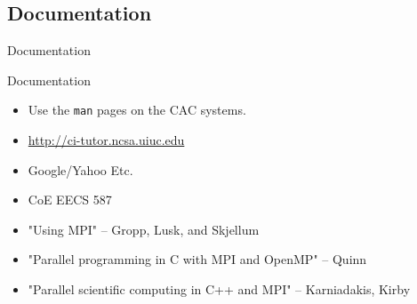 \documentclass[handout]{beamer}
\begin{document}
\subsection{Documentation}
\begin{frame}{Documentation}
\begin{block}{Documentation}
 \begin{itemize}
  \item Use the \texttt{man} pages on the CAC systems.
  \item \url{http://ci-tutor.ncsa.uiuc.edu}
  \item Google/Yahoo Etc.
  \item CoE EECS 587
  \item "Using MPI" -- Gropp, Lusk, and Skjellum  
  \item "Parallel programming in C with MPI and OpenMP" -- Quinn
  \item "Parallel scientific computing in C++ and MPI" -- Karniadakis, Kirby
 \end{itemize}
\end{block}

\end{frame}
\end{document}
